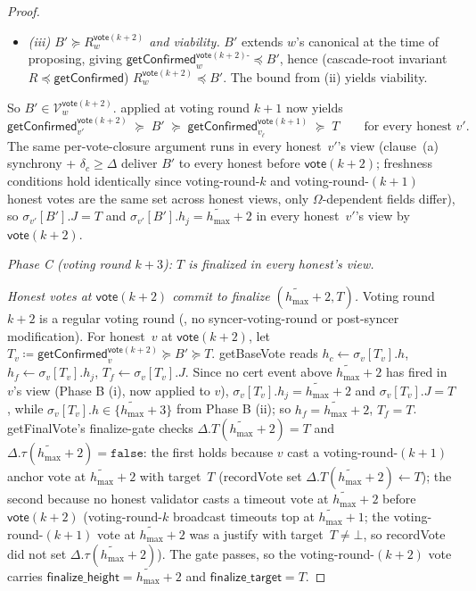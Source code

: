 \ifx\litemode\undefined\documentclass{article}\fi
\newcommand{\V}[0]{\ensuremath{\mathcal{V}}}
\newcommand{\finalizeHeight}{\mathsf{finalize\_height}}
\newcommand{\finalizeTarget}{\mathsf{finalize\_target}}
\newcommand{\hmax}{\ensuremath{h_{\max}}\xspace}
\newcommand{\vote}{\ensuremath{\mathsf{vote}}}
\newcommand{\comm}[1]{\ensuremath{\widetilde{#1}}}
\newcommand{\getBaseVote}{\textsf{getBaseVote}\xspace}
\newcommand{\getFinalVote}{\textsf{getFinalVote}\xspace}
\newcommand{\getConfirmed}{\textsf{getConfirmed}\xspace}
\theoremstyle{plain}
\theoremstyle{definition}
\theoremstyle{remark}
\begin{document}
\begin{proof}
\begin{itemize}
  \item \emph{(iii) $B' \succeq R_w^{\vote(k+2)}$ and viability.}
    $B'$ extends $w$'s canonical at the time of proposing, giving $\getConfirmed_w^{\vote(k+2)\text{-}} \preceq B'$, hence (cascade-root invariant $R \preceq \getConfirmed$) $R_w^{\vote(k+2)} \preceq B'$. The bound from (ii) yields viability.
\end{itemize}
So $B' \in \V_w^{\vote(k+2)}$.  applied at voting round $k+1$ now yields
\[
  \getConfirmed_{v'}^{\vote(k+2)} \;\succeq\; B' \;\succeq\; \getConfirmed_{v_\ell}^{\vote(k+1)} \;\succeq\; T \qquad \text{for every honest } v'.
\]
The same per-vote-closure argument runs in every honest~$v'$'s view (clause~(a) synchrony + $\delta_c \geq \Delta$ deliver $B'$ to every honest before $\vote(k+2)$; freshness conditions hold identically since voting-round-$k$ and voting-round-$(k+1)$ honest votes are the same set across honest views, only $\Omega$-dependent fields differ), so $\sigma_{v'}[B'].J = T$ and $\sigma_{v'}[B'].h_j = \comm{\hmax}+2$ in every honest~$v'$'s view by $\vote(k+2)$.

\medskip
\noindent\emph{Phase C (voting round $k+3$): $T$ is finalized in every honest's view.}

\emph{Honest votes at $\vote(k+2)$ commit to finalize $(\comm{\hmax}+2, T)$.}
Voting round $k+2$ is a regular voting round (, no syncer-voting-round or post-syncer modification). For honest~$v$ at $\vote(k+2)$, let $T_v \coloneqq \getConfirmed_v^{\vote(k+2)} \succeq B' \succeq T$. \getBaseVote{} reads $h_c \gets \sigma_v[T_v].h$, $h_f \gets \sigma_v[T_v].h_j$, $T_f \gets \sigma_v[T_v].J$. Since no cert event above $\comm{\hmax}+2$ has fired in $v$'s view (Phase B (i), now applied to $v$), $\sigma_v[T_v].h_j = \comm{\hmax}+2$ and $\sigma_v[T_v].J = T$, while $\sigma_v[T_v].h \in \{\comm{\hmax}+3\}$ from Phase B (ii); so $h_f = \comm{\hmax}+2$, $T_f = T$.
\getFinalVote{}'s finalize-gate checks $\Delta.T(\comm{\hmax}+2) = T$ and $\Delta.\tau(\comm{\hmax}+2) = \mathtt{false}$: the first holds because $v$ cast a voting-round-$(k+1)$ anchor vote at $\comm{\hmax}+2$ with target~$T$ (recordVote{} set $\Delta.T(\comm{\hmax}+2) \gets T$); the second because no honest validator casts a timeout vote at $\comm{\hmax}+2$ before $\vote(k+2)$ (voting-round-$k$ broadcast timeouts top at $\comm{\hmax}+1$; the voting-round-$(k+1)$ vote at $\comm{\hmax}+2$ was a justify with target~$T \neq \bot$, so recordVote{} did not set $\Delta.\tau(\comm{\hmax}+2)$). The gate passes, so the voting-round-$(k+2)$ vote carries $\finalizeHeight = \comm{\hmax}+2$ and $\finalizeTarget = T$.


\end{proof}
\end{document}
